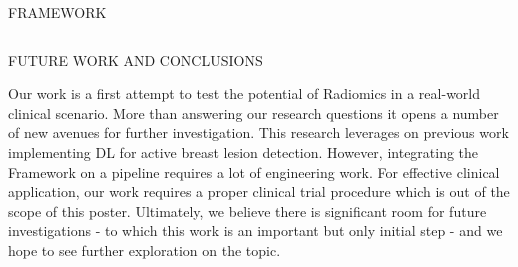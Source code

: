 \documentclass[final]{beamer}
\begin{document}
\begin{frame}[t, fragile = singleslide]{}
\begin{columns}[t]
\begin{column}{0.945\textwidth}
\begin{block}{FRAMEWORK}
\end{block}

\end{column}

\end{columns}

\hfill

\begin{columns}[t]

\begin{column}{0.45\textwidth}

\begin{block}{FUTURE WORK AND CONCLUSIONS}

Our work is a first attempt to test the potential of Radiomics in a real-world clinical scenario.
More than answering our research questions it opens a number of new avenues for further investigation.
This research leverages on previous work implementing DL for active breast lesion detection.
However, integrating the Framework on a pipeline requires a lot of engineering work.
For effective clinical application, our work requires a proper clinical trial procedure which is out of the scope of this poster.
Ultimately, we believe there is significant room for future investigations - to which this work is an important but only initial step - and we hope to see further exploration on the topic.

\end{block}


\end{column}
\end{columns}
\end{frame}
\end{document}
